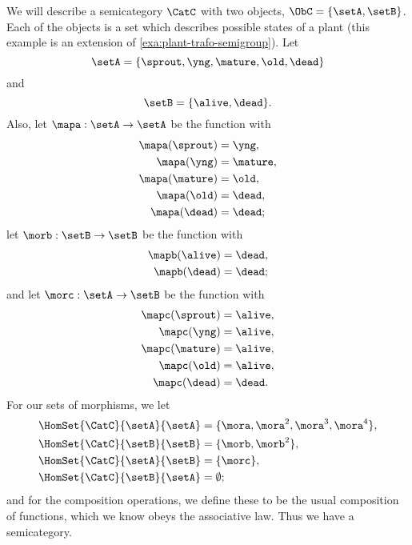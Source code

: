 \begin{example}\label{exa:semicat-plant-states}
We will describe a semicategory $\CatC$ with two objects, $\ObC = \{ \setA, \setB \}$. Each of the objects is a set which describes possible states of a plant (this example is an extension of \cref{exa:plant-trafo-semigroup}). 
Let 
\begin{equation}
\setA = \{ \sprout, \yng, \mature, \old, \dead \}
\end{equation}
and
\begin{equation}
\setB = \{ \alive, \dead \}.
\end{equation}
Also, let $\mapa : \setA \to \setA$ be the function with
\begin{align*}
        \mapa(\sprout) &=  \yng, \\
        \mapa(\yng) &=  \mature, \\
        \mapa(\mature) &=  \old, \\
        \mapa( \old) &= \dead, \\
        \mapa (\dead) &= \dead;
    \end{align*}
let $\morb : \setB \to \setB$ be the function with 
\begin{align*}
        \mapb(\alive) &=  \dead, \\
        \mapb(\dead) &=  \dead;
    \end{align*}
    and let $\morc : \setA \to \setB$ be the function with
    \begin{align*}
        \mapc(\sprout) & = \alive,  \\
        \mapc(\yng)    & =  \alive, \\
        \mapc(\mature) & = \alive , \\
        \mapc( \old)   & = \alive,  \\
        \mapc (\dead)  & = \dead.
    \end{align*}
For our sets of morphisms, we let 
\begin{align*}
        \HomSet{\CatC}{\setA}{\setA} &= \{ \mora, \mora^2, \mora^3, \mora^4 \}, \\
        \HomSet{\CatC}{\setB}{\setB} &=  \{ \morb, \morb^2 \}, \\
        \HomSet{\CatC}{\setA}{\setB} &=  \{ \morc \}, \\
        \HomSet{\CatC}{\setB}{\setA} &= \emptyset;
\end{align*}
and for the composition operations, we define these to be the usual composition of functions, which we know obeys the associative law. Thus we have a semicategory. 
\end{example}

